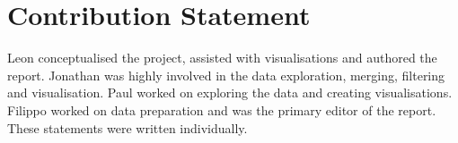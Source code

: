 \documentclass{article}
\theoremstyle{plain}
\theoremstyle{definition}
\theoremstyle{remark}
\begin{document}
\section*{Contribution Statement}

Leon conceptualised the project, assisted with visualisations and authored the report. Jonathan was highly involved in the data exploration, merging, filtering and visualisation. Paul worked on exploring the data and creating visualisations. Filippo worked on data preparation and was the primary editor of the report. These statements were written individually.
\\






\end{document}
